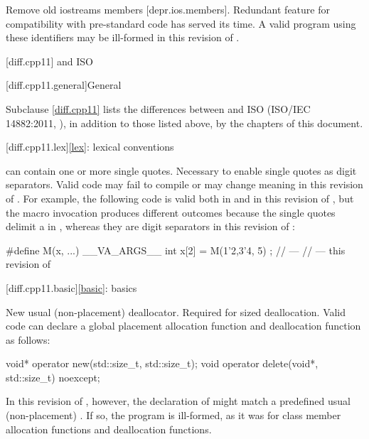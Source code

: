 \nodiffref
\change
Remove old iostreams members [depr.ios.members].
\rationale
Redundant feature for compatibility with pre-standard code
has served its time.
\effect
A valid \CppXIV{} program using these identifiers
may be ill-formed in this revision of \Cpp{}.

[diff.cpp11]{\Cpp{} and ISO \CppXI{}}

[diff.cpp11.general]{General}

\pnum
{}%
Subclause \ref{diff.cpp11} lists the differences between \Cpp{} and
ISO \CppXI{} (ISO/IEC 14882:2011, ),
in addition to those listed above,
by the chapters of this document.

[diff.cpp11.lex]{\ref{lex}: lexical conventions}

\change
{} can contain one or more single quotes.
\rationale
Necessary to enable single quotes as digit separators.
\effect
Valid \CppXI{} code may fail to compile or may change meaning in this
revision of \Cpp{}. For example, the following code is valid both in \CppXI{} and in
this revision of \Cpp{}, but the macro invocation produces different outcomes
because the single quotes delimit a  in \CppXI{}, whereas they are digit
separators in this revision of \Cpp{}:
\begin{codeblock}
#define M(x, ...) __VA_ARGS__
int x[2] = { M(1'2,3'4, 5) };
//  --- \CppXI{}
//  --- this revision of \Cpp{}
\end{codeblock}

[diff.cpp11.basic]{\ref{basic}: basics}

\change
New usual (non-placement) deallocator.
\rationale
Required for sized deallocation.
\effect
Valid \CppXI{} code can declare a global placement allocation function and
deallocation function as follows:
\begin{codeblock}
void* operator new(std::size_t, std::size_t);
void operator delete(void*, std::size_t) noexcept;
\end{codeblock}

In this revision of \Cpp{}, however, the declaration of 
might match a predefined usual (non-placement)
. If so, the
program is ill-formed, as it was for class member allocation functions and
deallocation functions.


